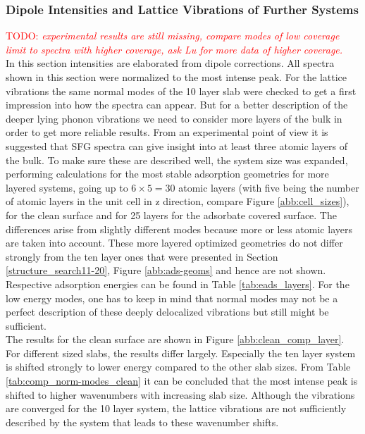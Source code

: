 \documentclass[11pt,DIV=13,BCOR=5mm,a4paper,headinclude]{scrbook}
\newcommand\todo[1]{\textcolor{red}{TODO: \textit{{#1}}}}
\begin{document}
\subsubsection{Dipole Intensities and Lattice Vibrations of Further Systems}\label{phonons}
\todo{experimental results are still missing, compare modes of low coverage limit to spectra with higher coverage, ask Lu for more data of higher coverage.}
\\
In this section intensities are elaborated from dipole corrections.
All spectra shown in this section were normalized to the most intense peak.
For the lattice vibrations the same normal modes of the 10 layer slab were checked to get a first impression into how the spectra can appear.
But for a better description of the deeper lying phonon vibrations we need to consider more layers of the bulk in order to get more reliable results.
From an experimental point of view it is suggested that SFG spectra can give insight into at least three atomic layers of the bulk.
To make sure these are described well, the system size was expanded, performing calculations for the most stable adsorption geometries for more layered systems, going up to $6\times 5=30$ atomic layers (with five being the number of atomic layers in the unit cell in z direction, compare Figure \ref{abb:cell_sizes}), for the clean surface and for 25 layers for the adsorbate covered surface.
The differences arise from slightly different modes because more or less atomic layers are taken into account.
These more layered optimized geometries do not differ strongly from the ten layer ones that were presented in Section \ref{structure_search11-20}, Figure \ref{abb:ads-geoms} and hence are not shown.
Respective adsorption energies can be found in Table \ref{tab:eads_layers}.
For the low energy modes, one has to keep in mind that normal modes may not be a perfect description of these deeply delocalized vibrations but still might be sufficient.
\\
The results for the clean surface are shown in Figure \ref{abb:clean_comp_layer}.
For different sized slabs, the results differ largely.
Especially the ten layer system is shifted strongly to lower energy compared to the other slab sizes.
From Table \ref{tab:comp_norm-modes_clean} it can be concluded that the most intense peak is shifted to higher wavenumbers with increasing slab size.
Although the vibrations are converged for the 10 layer system, the lattice vibrations are not sufficiently described by the system that leads to these wavenumber shifts.
\end{document}
